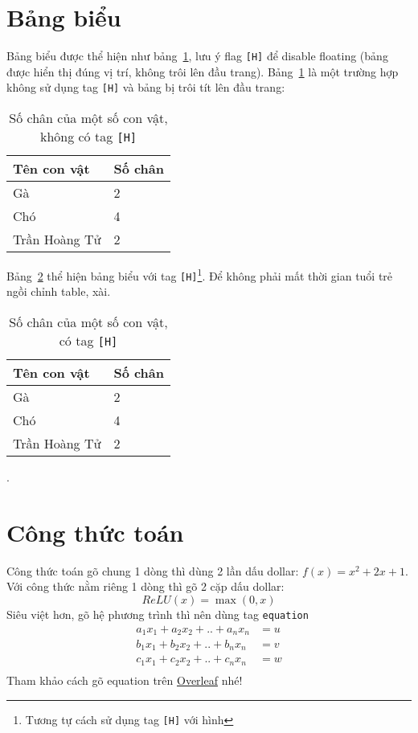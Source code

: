 \documentclass[a4paper,14pt]{article}
\begin{document}
	\section{Bảng biểu}
	Bảng biểu được thể hiện như bảng~\ref{tab:my_label}, lưu ý flag \texttt{[H]} để disable floating (bảng được hiển thị đúng vị trí, không trôi lên đầu trang). Bảng~\ref{tab:my_label} là một trường hợp không sử dụng tag \texttt{[H]} và bảng bị trôi tít lên đầu trang:
	\begin{table}%
		\centering
		\begin{tabular}{|l|l|}
			\hline
			\textbf{Tên con vật} & \textbf{Số chân} \\ \hline
			Gà & 2 \\ \hline
			Chó & 4 \\ \hline
			Trần Hoàng Tử & 2 \\ \hline
		\end{tabular}
		\caption{Số chân của một số con vật, không có tag \texttt{[H]}}
		\label{tab:my_label}
	\end{table}
	Bảng~\ref{tab:my_label_with_H_tag} thể hiện bảng biểu với tag \texttt{[H]}\footnote{Tương tự cách sử dụng tag \texttt{[H]} với hình}. Để không phải mất thời gian tuổi trẻ ngồi chỉnh table, xài.
	\begin{table}[h]
		\centering
		\begin{tabular}{|l|l|}
			\hline
			\textbf{Tên con vật} & \textbf{Số chân} \\ \hline
			Gà & 2 \\ \hline
			Chó & 4 \\ \hline
			Trần Hoàng Tử & 2 \\ \hline
		\end{tabular}
		\caption{Số chân của một số con vật, có tag \texttt{[H]}}
		\label{tab:my_label_with_H_tag}
	\end{table}.

\section{Công thức toán}
Công thức toán gõ chung 1 dòng thì dùng 2 lần dấu dollar: $f(x) = x^2 + 2x + 1$. Với công thức nằm riêng 1 dòng thì gõ 2 cặp dấu dollar:
$$
ReLU(x) = \max(0, x)
$$
Siêu việt hơn, gõ hệ phương trình thì nên dùng tag \texttt{equation}
\begin{equation*}
	\begin{aligned}
		a_1x_1 + a_2x_2 + .. + a_nx_n &= u \\
		b_1x_1 + b_2x_2 + .. + b_nx_n &= v \\
		c_1x_1 + c_2x_2 + .. + c_nx_n &= w \\
	\end{aligned}
\end{equation*}
Tham khảo cách gõ equation trên \href{https://www.overleaf.com/learn/latex/Mathematical_expressions}{Overleaf} nhé!
\end{document}
